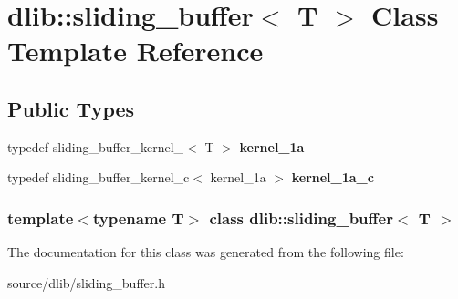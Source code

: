 \hypertarget{classdlib_1_1sliding__buffer}{
\section{dlib::sliding\_\-buffer$<$ T $>$ Class Template Reference}
\label{classdlib_1_1sliding__buffer}
}
\subsection*{Public Types}
\begin{DoxyCompactItemize}
\item 
\hypertarget{classdlib_1_1sliding__buffer_ad23f5fcafc7a3c39f633c26f2527a28f}{
typedef sliding\_\-buffer\_\-kernel\_$<$ T $>$ {\bfseries kernel\_\-1a}}
\label{classdlib_1_1sliding__buffer_ad23f5fcafc7a3c39f633c26f2527a28f}

\item 
\hypertarget{classdlib_1_1sliding__buffer_a50f73e9f5f01302aa924d38d622a2701}{
typedef sliding\_\-buffer\_\-kernel\_\-c$<$ kernel\_\-1a $>$ {\bfseries kernel\_\-1a\_\-c}}
\label{classdlib_1_1sliding__buffer_a50f73e9f5f01302aa924d38d622a2701}

\end{DoxyCompactItemize}
\subsubsection*{template$<$typename T$>$ class dlib::sliding\_\-buffer$<$ T $>$}



The documentation for this class was generated from the following file:\begin{DoxyCompactItemize}
\item 
source/dlib/sliding\_\-buffer.h\end{DoxyCompactItemize}

